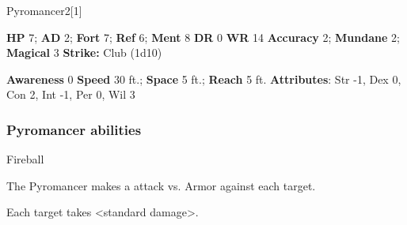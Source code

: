   \begin{monsection}{Pyromancer}{2}[1]
    \vspace{-1em}\vspace{-1em}
    \begin{spellcontent}
      \begin{spelltargetinginfo}
        \pari \textbf{HP} 7;
          \textbf{AD} 2;
          \textbf{Fort} 7;
          \textbf{Ref} 6;
          \textbf{Ment} 8
        \pari \textbf{DR} 0
        \pari \textbf{WR} 14
        \pari \textbf{Accuracy} 2;
          \textbf{Mundane} 2;
          \textbf{Magical} 3
        \pari \textbf{Strike:}
            Club  (1d10)
      \end{spelltargetinginfo}
    \end{spellcontent}
    \begin{monsterfooter}
      \pari \textbf{Awareness} 0
      \pari \textbf{Speed} 30 ft.;
        \textbf{Space} 5 ft.;
        \textbf{Reach} 5 ft.
      \pari \textbf{Attributes}:
        Str -1, Dex 0, Con 2,
        Int -1, Per 0, Wil 3
    \end{monsterfooter}
  \end{monsection}
  \subsubsection{Pyromancer abilities}
        
    \begin{freeability}{Fireball}
      
    
      The Pyromancer makes a  attack
        vs. Armor against each target.
    
    \hit Each target takes <standard damage>.
    
  
    \end{freeability}
  
